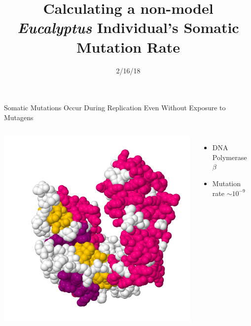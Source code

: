 \documentclass{beamer}
\title[Eucalyptus Somatic Mutation]{Calculating a non-model \textit{Eucalyptus} Individual's Somatic Mutation Rate}
\date{2/16/18}
\author{Adam Orr\hskip 1em \faicon{twitter}@AdamJOrr}
\begin{document}
\frame{\titlepage}


\begin{frame}{Somatic Mutations Occur During Replication Even Without Exposure to Mutagens}
\begin{columns}
		\includegraphics[width=\linewidth]{dnapol_beta.png}
		\begin{itemize}
			\item DNA Polymerase $\beta$
			\item Mutation rate $\sim10^{-9}$
		\end{itemize}
\end{columns}
\end{frame}
\end{document}
